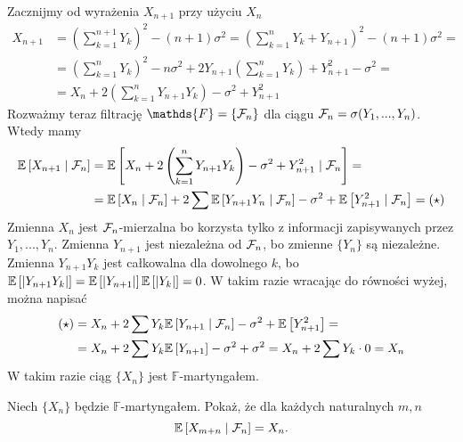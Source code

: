 \begin{solution}
  Zacznijmy od wyrażenia $X_{n+1}$ przy użyciu $X_n$
  \begin{align*}
    X_{n+1}&=\left( \sum_{k=1}^{n+1}Y_{k} \right)^2 - (n+1)\sigma^2= \left( \sum_{k=1}^nY_k +Y_{n+1} \right)^2 - (n+1)\sigma^2=\\ 
           &=\left(\sum_{k=1}^n Y_k \right)^2 -n\sigma ^2 + 2 Y_{n+1}\left( \sum_{k=1}^n Y_k \right) +Y_{n+1}^2 -\sigma^2=\\ 
           &=X_n+2\left( \sum_{k=1}^nY_{n+1}Y_k \right) -\sigma^2 + Y_{n+1}^2
  \end{align*}
  Rozważmy teraz filtrację $\mathds{F}=\{\set{F}_n\}$ dla ciągu $\mathcal{F}_n=\sigma(Y_1,...,Y_n)$. Wtedy mamy
  \begin{align*}
    \expected{X_{n+1}}{\set{F}_n}&=\expected{X_n+2 \left( \sum_{k=1}^nY_{n+1}Y_k \right) -\sigma^2+Y_{n+1}^2}{\set{F}_n}=\\
                                 &=\expected{X_n}{\set{F}_n}+2\sum\expected{Y_{n+1}Y_n}{\set{F}_n}-\sigma^2+\expected{Y_{n+1}^2}{\set{F}_n}=(\star)
  \end{align*}
  Zmienna $X_n$ jest $\mathcal{F}_n$-mierzalna bo korzysta tylko z informacji zapisywanych przez $Y_1,...,Y_n$. Zmienna $Y_{n+1}$ jest niezależna od $\mathcal{F}_n$, bo zmienne $\{Y_n\}$ są niezależne. Zmienna $Y_{n+1}Y_k$ jest całkowalna dla dowolnego $k$, bo $\expected{|Y_{n+1}Y_k|}=\expected{|Y_{n+1}|}\expected{|Y_k|}=0$. W takim razie wracając do równości wyżej, można napisać
  \begin{align*}
    (\star)&=X_n+2\sum Y_{k}\expected{Y_{n+1}}{\set{F}_n}-\sigma^2+\expected{Y_{n+1}^2}=\\ 
           &=X_n+2\sum Y_k\expected{Y_{n+1}}-\sigma^2+\sigma^2=X_n+2\sum Y_k\cdot 0=X_n
  \end{align*}
  W takim razie ciąg $\{X_n\}$ jest $\mathds{F}$-martyngałem.
\end{solution}

\begin{problem}
  Niech $\{X_n\}$ będzie $\mathds{F}$-martyngałem. Pokaż, że dla każdych naturalnych $m,n$
  $$\expected{X_{m+n}}{\set{F}_n}=X_n.$$
\end{problem}

